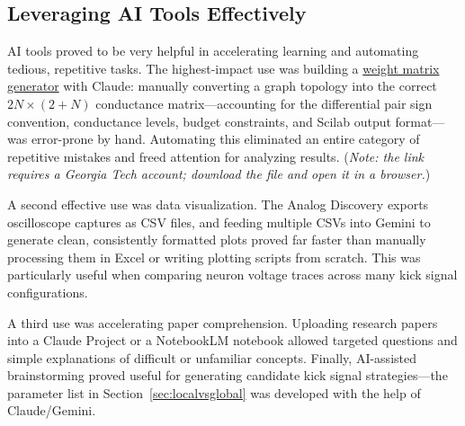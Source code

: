 \documentclass[12pt, letterpaper]{article}
\begin{document}
\subsection{Leveraging AI Tools Effectively}

AI tools proved to be very helpful in accelerating learning and automating tedious, repetitive tasks. The highest-impact use was
building a \href{https://gtvault-my.sharepoint.com/:u:/g/personal/emazor7_gatech_edu/IQDh167ysJgUTLz5orXGIl0TAVIHlGKhUOu2n0BPOJSZWZk?e=WR4lVW}{weight matrix generator} with Claude: manually converting a graph
topology into the correct $2N \times (2+N)$ conductance matrix---accounting for the
differential pair sign convention, conductance levels, budget constraints, and Scilab
output format---was error-prone by hand. Automating this eliminated an entire category of
repetitive mistakes and freed attention for analyzing results. {\small\color{darkgray}(\textit{Note: the link requires a Georgia Tech account; download the file and open it in a browser.})}

A second effective use was data visualization. The Analog Discovery exports
oscilloscope captures as CSV files, and feeding multiple CSVs into Gemini to generate
clean, consistently formatted plots proved far faster than manually processing them
in Excel or writing plotting scripts from scratch. This was particularly useful when
comparing neuron voltage traces across many kick signal configurations.

A third use was accelerating paper comprehension. Uploading research papers into a
Claude Project or a NotebookLM notebook allowed targeted questions and simple explanations of difficult or unfamiliar concepts. Finally, AI-assisted brainstorming proved useful for generating
candidate kick signal strategies---the parameter list in Section~\ref{sec:localvsglobal}
was developed with the help of Claude/Gemini.
\end{document}

